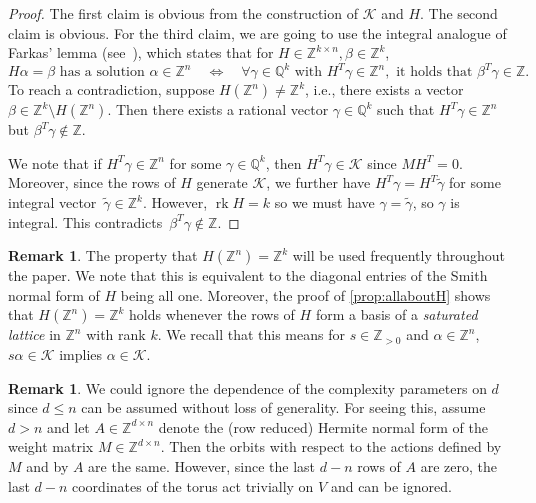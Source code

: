 \documentclass[10pt,a4paper]{article}
\theoremstyle{definition}
\newtheorem{remark}[theorem]{Remark}
\DeclareMathOperator{\rk}{rk}
\newcommand{\QQ}{\mathbb{Q}}
\newcommand{\ZZ}{\mathbb{Z}}
\numberwithin{equation}{section}
\begin{document}
\begin{proof}
The first claim is obvious from the construction of $\mathcal{K}$ and $H$.
The second claim is obvious. %
For the third claim, we are going to use the integral analogue of Farkas' lemma
(see~\cite[Corollary~4.1a]{integer-farkas}), which states that for $H\in\ZZ^{k\times n}, \beta\in\ZZ^k$,
\[
	H \alpha = \beta \text{ has a solution }\alpha\in\ZZ^n \quad \iff\quad \forall \gamma\in\QQ^k
     \text{ with }H^T \gamma\in\ZZ^n, \text{ it holds that } \beta^T \gamma\in\ZZ.
\]
To reach a contradiction, suppose $H(\ZZ^n)\neq\ZZ^k$, i.e., there exists a vector $\beta\in\ZZ^k\setminus H(\ZZ^n)$.
Then there exists a rational vector $\gamma\in\QQ^k$ such that $H^T \gamma\in\ZZ^n$ but $\beta^T \gamma\not\in\ZZ$.

We note that if $H^T\gamma\in\ZZ^n$ for some $\gamma\in\QQ^k$, then $H^T\gamma\in\mathcal{K}$ since $MH^T=0$.
Moreover, since the rows of $H$ generate $\mathcal{K}$,
we further have $H^T \gamma = H^T \tilde{\gamma}$ for some integral vector~$\tilde{\gamma}\in\ZZ^k$.
However, $\rk H=k$ so we must have $\gamma=\tilde{\gamma}$, so $\gamma$ is integral.
This contradicts~$\beta^T \gamma\not\in\ZZ$.
\end{proof}

\begin{remark}
The property that $H(\ZZ^n)=\ZZ^k$ will be used frequently throughout the paper.
We note that this is equivalent to the diagonal entries of the Smith normal form of $H$ being all one. Moreover, the proof of \cref{prop:allaboutH} shows that $H(\ZZ^n)=\ZZ^k$ holds whenever
the rows of $H$ form a basis of a \emph{saturated lattice} in $\ZZ^n$ with rank $k$. We recall that this means for $s\in\ZZ_{>0}$ and $\alpha\in\ZZ^n$, $s\alpha\in\mathcal{K}$ implies $\alpha\in\mathcal{K}$.
\end{remark}


\begin{remark}
We could ignore the dependence of the complexity parameters on $d$
since $d\leq n$  can be assumed  without loss of generality.
For seeing this, assume $d>n$ and let
$A\in\ZZ^{d\times n}$ denote the (row reduced) Hermite normal form of
the weight matrix $M\in\ZZ^{d\times n}$.
Then the orbits with respect to the actions defined by $M$ and by $A$ are the same.
However, since the last $d-n$ rows of $A$ are zero,
the last $d-n$ coordinates of the torus act trivially on $V$
and can be ignored.
\end{remark}
\end{document}

